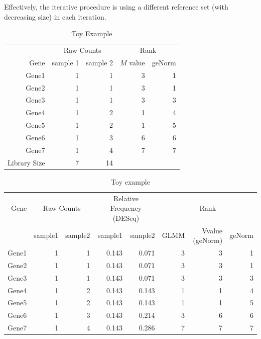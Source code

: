 \documentclass[11pt, a4paper]{article}
\begin{document}
Effectively, the iterative procedure is using a different reference set (with
decreasing size) in each iteration.

\begin{table}[ht]
	\centering
	\begin{tabular}{rrrrr}
		\hline
		 & \multicolumn{2}{c}{Raw Counts} & \multicolumn{2}{c}{Rank}\\
	Gene	& sample 1 & sample 2 & $M$ value & geNorm \\ 
		\hline
		Gene1 & 1 & 1 & 3 & 1 \\ 
		Gene2 & 1 & 1 & 3 & 1 \\ 
		Gene3 & 1 & 1 & 3 & 3 \\ 
		Gene4 & 1 & 2 & 1 & 4 \\ 
		Gene5 & 1 & 2 & 1 & 5 \\ 
		Gene6 & 1 & 3 & 6 & 6 \\ 
		Gene7 & 1 & 4 & 7 & 7 \\ \hline 
	Library Size & 7 & 14 & & 	\\
		\hline
		\end{tabular}
		\caption{Toy Example} 
		\label{table:toyexample}
		\end{table}

\begin{table}[ht]
	\centering
	\caption{Toy example}
	\label{table:toyexample2}
	\begin{tabular}{rrrrrrrr}
		\hline
	Gene & \multicolumn{2}{c}{Raw Counts} & \multicolumn{2}{c}{Relative Frequency (DESeq)} & \multicolumn{3}{c}{Rank} \\
		& sample1 & sample2 & sample1 &sample2 & GLMM & Vvalue (geNorm) & geNorm \\ 
		\hline
		Gene1 & 1 & 1 & 0.143 & 0.071 & 3 & 3 & 1 \\ 
		Gene2 & 1 & 1 & 0.143 & 0.071 & 3 & 3 & 1 \\ 
		Gene3 & 1 & 1 & 0.143 & 0.071 & 3 & 3 & 3 \\ 
		Gene4 & 1 & 2 & 0.143 & 0.143 & 1 & 1 & 4 \\ 
		Gene5 & 1 & 2 & 0.143 & 0.143 & 1 & 1 & 5 \\ 
		Gene6 & 1 & 3 & 0.143 & 0.214 & 3 & 6 & 6 \\ 
		Gene7 & 1 & 4 & 0.143 & 0.286 & 7 & 7 & 7 \\ 
		\hline
	\end{tabular}
\end{table}




\end{document}
